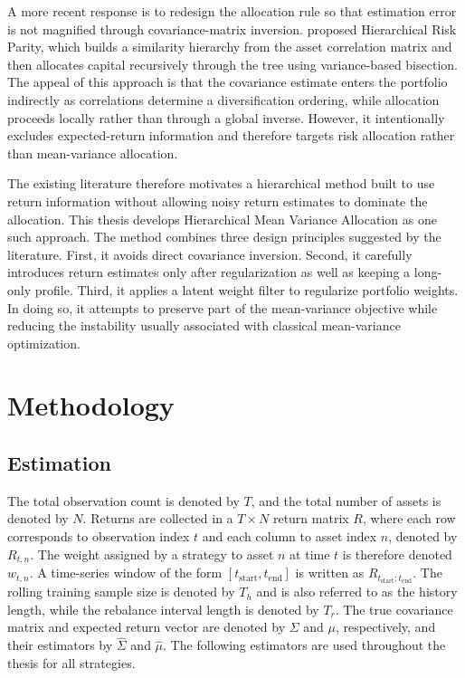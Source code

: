 \documentclass[12pt]{article}
\begin{document}
A more recent response is to redesign the allocation rule so that estimation error is not magnified through covariance-matrix inversion. \citet{lopezdeprado2016} proposed Hierarchical Risk Parity, which builds a similarity hierarchy from the asset correlation matrix and then allocates capital recursively through the tree using variance-based bisection. The appeal of this approach is that the covariance estimate enters the portfolio indirectly as correlations determine a diversification ordering, while allocation proceeds locally rather than through a global inverse. However, it intentionally excludes expected-return information and therefore targets risk allocation rather than mean-variance allocation.

The existing literature therefore motivates a hierarchical method built to use return information without allowing noisy return estimates to dominate the allocation. This thesis develops Hierarchical Mean Variance Allocation as one such approach. The method combines three design principles suggested by the literature. First, it avoids direct covariance inversion. Second, it carefully introduces return estimates only after regularization as well as keeping a long-only profile. Third, it applies a latent weight filter to regularize portfolio weights. In doing so, it attempts to preserve part of the mean-variance objective while reducing the instability usually associated with classical mean-variance optimization.

\section{Methodology}
\label{sec:meth}
\subsection{Estimation} 
The total observation count is denoted by $T$, and the total number of assets is denoted by $N$. Returns are collected in a $T \times N$ return matrix $R$, where each row corresponds to observation index $t$ and each column to asset index $n$, denoted by $R_{t,n}$. The weight assigned by a strategy to asset $n$ at time $t$ is therefore denoted $w_{t,n}$. A time-series window of the form $[t_{\mathrm{start}},t_{\mathrm{end}}]$ is written as $R_{t_{\mathrm{start}}:t_{\mathrm{end}}}$. The rolling training sample size is denoted by $T_h$ and is also referred to as the history length, while the rebalance interval length is denoted by $T_r$. The true covariance matrix and expected return vector are denoted by $\Sigma$ and $\mu$, respectively, and their estimators by $\hat{\Sigma}$ and $\hat{\mu}$. The following estimators are used throughout the thesis for all strategies.
\end{document}

